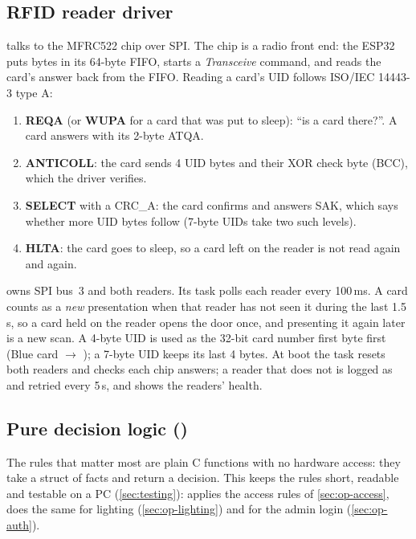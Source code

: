 \subsection{RFID reader driver}
\label{sec:sw-rfid}
 talks to the MFRC522 chip over SPI. The chip is a radio front
end: the ESP32 puts bytes in its 64-byte FIFO, starts a \emph{Transceive} command, and reads the
card's answer back from the FIFO. Reading a card's UID follows ISO/IEC 14443-3 type A:
\begin{enumerate}
  \item \textbf{REQA} (or \textbf{WUPA} for a card that was put to sleep): ``is a card there?''.
        A card answers with its 2-byte ATQA.
  \item \textbf{ANTICOLL}: the card sends 4 UID bytes and their XOR check byte (BCC), which the
        driver verifies.
  \item \textbf{SELECT} with a CRC\_A: the card confirms and answers SAK, which says whether more
        UID bytes follow (7-byte UIDs take two such levels).
  \item \textbf{HLTA}: the card goes to sleep, so a card left on the reader is not read again and
        again.
\end{enumerate}
 owns SPI bus~3 and both readers. Its task polls each reader every
100\,ms. A card counts as a \emph{new} presentation when that reader has not seen it during the last
1.5\,s, so a card held on the reader opens the door once, and presenting it again later is a new
scan. A 4-byte UID is used as the 32-bit card number first byte first (Blue card
 $\rightarrow$ ); a 7-byte UID keeps its last 4 bytes. At boot
the task resets both readers and checks each chip answers; a reader that does not is logged as
 and retried every 5\,s, and  shows the readers' health.

\subsection{Pure decision logic ()}
The rules that matter most are plain C functions with no hardware access: they take a struct of
facts and return a decision. This keeps the rules short, readable and testable on a PC
(\cref{sec:testing}):  applies the access rules of \cref{sec:op-access},
 does the same for lighting (\cref{sec:op-lighting}) and
 for the admin login (\cref{sec:op-auth}).

